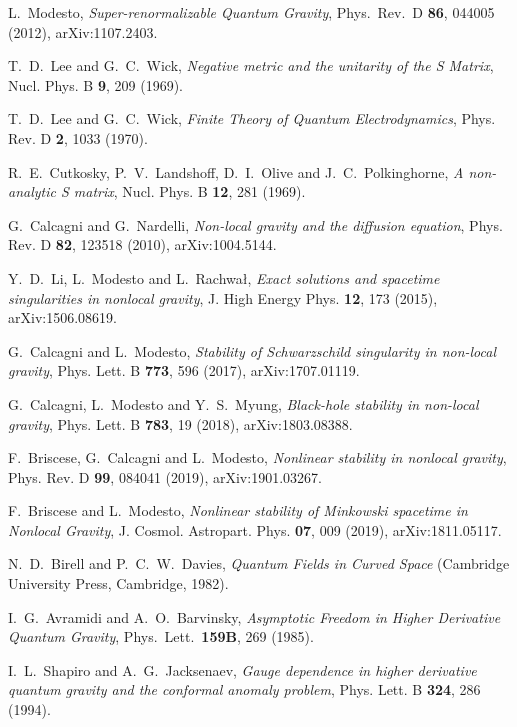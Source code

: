 \documentclass[aps,prd,a4paper,twocolumn,showpacs,showkeys,preprintnumbers,amsmath,amssymb,nofootinbib]{revtex4-2}
\numberwithin{equation}{section}
\begin{document}
\begin{thebibliography}{}
L.~Modesto,
{\it Super-renormalizable Quantum Gravity},
Phys.\ Rev.\ D {\bf 86}, 044005 (2012), arXiv:1107.2403.

T.~D.~Lee and G.~C.~Wick,
{\it Negative metric and the unitarity of the S Matrix},
Nucl. Phys. B \textbf{9}, 209 (1969).

T.~D.~Lee and G.~C.~Wick,
{\it Finite Theory of Quantum Electrodynamics},
Phys. Rev. D \textbf{2}, 1033 (1970).

R.~E.~Cutkosky, P.~V.~Landshoff, D.~I.~Olive and J.~C.~Polkinghorne,
{\it A non-analytic S matrix},
Nucl. Phys. B \textbf{12}, 281 (1969).

G.~Calcagni and G.~Nardelli,
{\it Non-local gravity and the diffusion equation},
Phys. Rev. D \textbf{82}, 123518 (2010),
arXiv:1004.5144.

Y.~D.~Li, L.~Modesto and L.~Rachwa\l{},
{\it Exact solutions and spacetime singularities in nonlocal gravity},
J. High Energy Phys. \textbf{12}, 173 (2015),
arXiv:1506.08619.

G.~Calcagni and L.~Modesto,
{\it Stability of Schwarzschild singularity in non-local gravity},
Phys. Lett. B \textbf{773}, 596 (2017),
arXiv:1707.01119.

G.~Calcagni, L.~Modesto and Y.~S.~Myung,
{\it Black-hole stability in non-local gravity},
Phys. Lett. B \textbf{783}, 19 (2018),
arXiv:1803.08388.

F.~Briscese, G.~Calcagni and L.~Modesto,
{\it Nonlinear stability in nonlocal gravity},
Phys. Rev. D \textbf{99}, 084041 (2019),
arXiv:1901.03267.

F.~Briscese and L.~Modesto,
{\it Nonlinear stability of Minkowski spacetime in Nonlocal Gravity},
J. Cosmol. Astropart. Phys. \textbf{07}, 009 (2019),
arXiv:1811.05117.

N.~D.~Birell and P.~C.~W.~Davies, 
{\it Quantum Fields in Curved Space}
(Cambridge University Press, Cambridge, 1982).
  
I.~G.~Avramidi and A.~O.~Barvinsky,
{\it Asymptotic Freedom in Higher Derivative Quantum Gravity},
Phys.\ Lett.\  {\bf 159B}, 269 (1985).

I.~L.~Shapiro and A.~G.~Jacksenaev,
{\it Gauge dependence in higher derivative quantum gravity and the conformal anomaly problem},
Phys. Lett. B \textbf{324}, 286 (1994).


\end{thebibliography}
\end{document}
